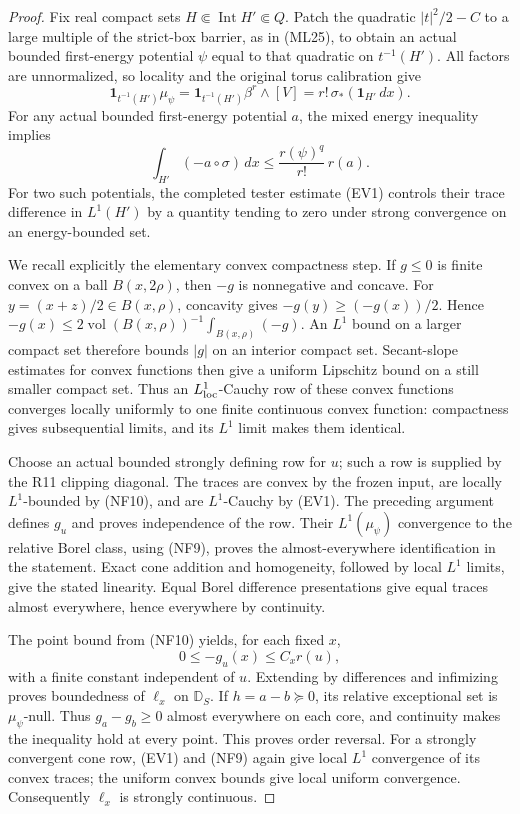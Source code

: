 \begin{proof}
Fix real compact sets $H\Subset\operatorname{Int}H'\Subset Q$.
Patch the quadratic $|t|^2/2-C$ to a large multiple of the
strict-box barrier, as in (ML25), to obtain an actual
bounded first-energy potential $\psi$ equal to that quadratic
on $t^{-1}(H')$. All factors are unnormalized, so locality
and the original torus calibration give
\[
           \mathbf1_{t^{-1}(H')}\mu_\psi
                   =\mathbf1_{t^{-1}(H')}\beta^r\wedge[V]
                   =r!\,\sigma_*(\mathbf1_{H'}\,dx).
 \tag{NF9}
\]
For any actual bounded first-energy potential $a$,
the mixed energy inequality implies
\[
              \int_{H'}(-a\circ\sigma)\,dx
                          \leq\frac{r(\psi)^q}{r!}\,r(a).
 \tag{NF10}
\]
For two such potentials, the completed tester estimate
(EV1) controls their trace difference in $L^1(H')$ by
a quantity tending to zero under strong convergence on
an energy-bounded set.

We recall explicitly the elementary convex compactness step.
If $g\leq0$ is finite convex on a ball $B(x,2\rho)$,
then $-g$ is nonnegative and concave. For
$y=(x+z)/2\in B(x,\rho)$, concavity gives
$-g(y)\geq(-g(x))/2$. Hence
$-g(x)\leq2\operatorname{vol}(B(x,\rho))^{-1}
\int_{B(x,\rho)}(-g)$. An $L^1$ bound on a larger
compact set therefore bounds $|g|$ on an interior compact
set. Secant-slope estimates for convex functions then give
a uniform Lipschitz bound on a still smaller compact set.
Thus an $L^1_{\rm loc}$-Cauchy row of these convex functions
converges locally uniformly to one finite continuous convex
function: compactness gives subsequential limits, and its
$L^1$ limit makes them identical.

Choose an actual bounded strongly defining row for $u$;
such a row is supplied by the R11 clipping diagonal.
The traces are convex by the frozen input, are locally
$L^1$-bounded by (NF10), and are $L^1$-Cauchy by (EV1).
The preceding argument defines $g_u$ and proves independence
of the row. Their $L^1(\mu_\psi)$ convergence to the
relative Borel class, using (NF9), proves the almost-everywhere
identification in the statement. Exact cone addition and
homogeneity, followed by local $L^1$ limits, give the stated
linearity. Equal Borel difference presentations give equal
traces almost everywhere, hence everywhere by continuity.

The point bound from (NF10) yields, for each fixed $x$,
\[
                     0\leq-g_u(x)\leq C_x r(u),
 \tag{NF11}
\]
with a finite constant independent of $u$. Extending by
differences and infimizing proves boundedness of $\ell_x$
on $\mathbb D_S$. If $h=a-b\succeq0$, its relative
exceptional set is $\mu_\psi$-null. Thus
$g_a-g_b\geq0$ almost everywhere on each core, and continuity
makes the inequality hold at every point. This proves order
reversal. For a strongly convergent cone row, (EV1) and
(NF9) again give local $L^1$ convergence of its convex
traces; the uniform convex bounds give local uniform
convergence. Consequently $\ell_x$ is strongly continuous.


\end{proof}
